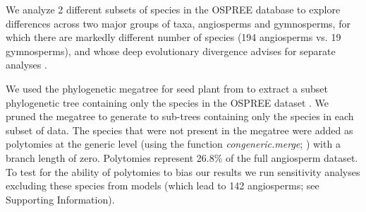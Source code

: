 \documentclass{article}\usepackage[]{graphicx}\usepackage[]{color}
\begin{document}
We analyze 2 different subsets of species in the OSPREE database to explore differences across two major groups of taxa, angiosperms and gymnosperms, for which there are markedly different number of species (194 angiosperms vs. 19 gymnosperms), and whose deep evolutionary divergence advises for separate analyses \citep{}.\\

We used the phylogenetic megatree for seed plant from \citet{smith2018constructing} to extract a subset phylogenetic tree containing only the species in the OSPREE dataset \citep{wolkovich2019}. We pruned the megatree to generate to sub-trees containing only the species in each subset of data. The species that were not present in the megatree were added as polytomies at the generic level (using the function \emph{congeneric.merge}; \citep{pearse2015pez}) with a branch length of zero. Polytomies represent 26.8\% of the full angiosperm dataset. To test for the ability of polytomies to bias our results we run sensitivity analyses excluding these species from models (which lead to 142 angiosperms; see Supporting Information). \\ 
\end{document}
